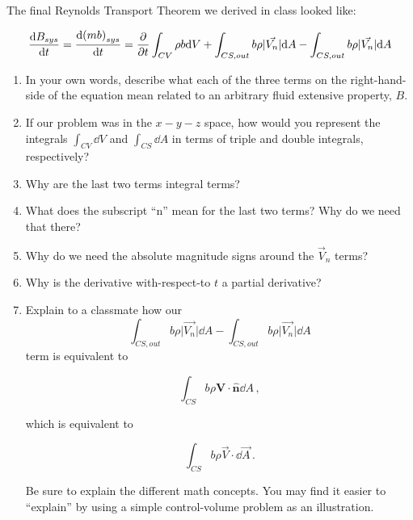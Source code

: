 \documentclass[../main.tex]{subfiles}
\begin{document}

The final Reynolds Transport Theorem we derived in class looked like:

\begin{equation*}
    \frac{\dd B_{sys}}{\dd t} = %
    \frac{\dd (mb)_{sys}}{\dd t} = %
    \pdv{t} \int_{CV} \rho b \dd V +%
    \int_{CS,out} b \rho \lvert{\vec{V_n}}\rvert \dd A -%
    \int_{CS,out} b \rho \lvert{\vec{V_n}}\rvert \dd A
\end{equation*}

\begin{enumerate}[label = (\alph*)]

    \item In your own words, describe what each of the three terms on the right-hand-side of the equation mean related to an arbitrary fluid extensive property, $B$.

    \item If our problem was in the $x-y-z$ space, how would you represent the integrals \(\int_{CV} \dd V\) and \(\int_{CS} \dd A\) in terms of triple and double integrals, respectively?

    \item Why are the last two terms integral terms?

    \item What does the subscript ``n'' mean for the last two terms? Why do we need that there?
   
    \item Why do we need the absolute magnitude signs around the \(\vec{V}_n\) terms?
   
    \item Why is the derivative with-respect-to \(t\) a partial derivative?
   
    \item Explain to a classmate how our 
        \[
            \int_{CS,out} b \rho \lvert{\vec{V_n}}\rvert \dd A -%
            \int_{CS,out} b \rho \lvert{\vec{V_n}}\rvert \dd A
        \]
        term is equivalent to

        \[
            \int_{CS} b \rho \boldsymbol{V} \cdot \hat{\boldsymbol{n}} \dd A \, ,
        \]

        which is equivalent to

        \[
            \int_{CS} b \rho \vec{V} \cdot \dd \vec{A} \, .
        \]

        Be sure to explain the different math concepts. You may find it easier to ``explain'' by using a simple control-volume problem as an illustration.
        
\end{enumerate}
\end{document}
